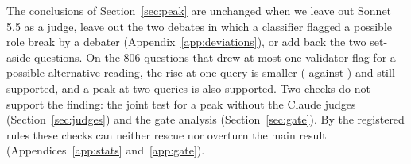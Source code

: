 The conclusions of Section~\ref{sec:peak} are unchanged when we leave out Sonnet 5.5 as a judge, leave out the two
debates in which a classifier flagged a possible role break by a debater (Appendix~\ref{app:deviations}), or add
back the two set-aside questions. On the 806 questions that drew at most one validator flag
for a possible alternative reading, the rise at one query is smaller (\detRise{} against \dOneZero{} \pp) and still
supported, and a peak at two queries is also supported. Two checks do not support the finding: the joint test for a peak without the Claude judges (Section~\ref{sec:judges}) and the gate analysis
(Section~\ref{sec:gate}). By the registered rules these checks can neither rescue nor overturn the main result
(Appendices~\ref{app:stats} and~\ref{app:gate}).
